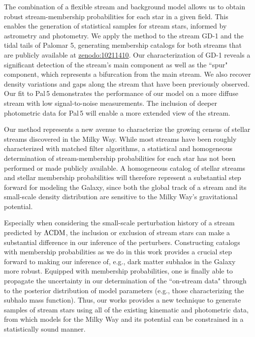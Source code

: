 \documentclass[twocolumn]{aastex631}
\newcommand{\stream}[1]{#1}
\begin{document}
    The combination of a flexible stream and background model allows us to
    obtain robust stream-membership probabilities for each star in a given
    field. This enables the generation of statistical samples for stream stars,
    informed by astrometry and photometry. We apply the method to the stream
    \stream{GD-1} and the tidal tails of \stream{Palomar 5}, generating
    membership catalogs for both streams that are publicly available at
    \href{https://zenodo.org/records/10211410}{zenodo:10211410}. Our
    characterization of \stream{GD-1} reveals a significant detection of the
    stream's main component as well as the ``spur" component, which represents a
    bifurcation from the main stream.  We also recover density variations and
    gaps along the stream that have been previously observed. Our fit to
    \stream{Pal\,5} demonstrates the performance of our model on a more diffuse
    stream with low signal-to-noise measurements.  The inclusion of deeper
    photometric data for \stream{Pal\,5} will enable a more extended view of the
    stream.
    
    
    Our method represents a new avenue to characterize the growing census of
    stellar streams discovered in the Milky Way. While most streams have been
    roughly characterized with matched filter algorithms, a statistical and
    homogeneous determination of stream-membership probabilities for each star
    has not been performed or made publicly available. A homogeneous catalog of
    stellar streams and stellar membership probabilities will therefore
    represent a substantial step forward for modeling the Galaxy, since both the
    global track of a stream and its small-scale density distribution are
    sensitive to the Milky Way's gravitational potential. 
    
    Especially when considering the small-scale perturbation history of a stream
    predicted by $\Lambda\rm{CDM}$, the inclusion or exclusion of stream stars
    can make a substantial difference in our inference of the perturbers.
    Constructing catalogs with membership probabilities as we do in this work
    provides a crucial step forward to making our inference of, e.g., dark
    matter subhalos in the Galaxy more robust. Equipped with membership
    probabilities, one is finally able to propagate the uncertainty in our
    determination of the ``on-stream data" through to the posterior distribution
    of model parameters (e.g., those characterizing the subhalo mass function).
    Thus, our works provides a new technique to generate samples of stream stars
    using all of the existing kinematic and photometric data, from which models
    for the Milky Way and its potential can be constrained in a statistically
    sound manner.
\end{document}
